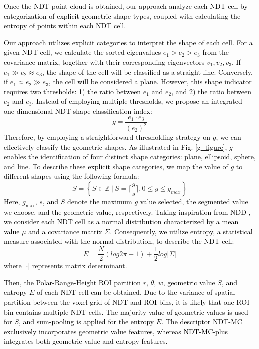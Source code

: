 \documentclass[letterpaper, 10 pt, conference]{ieeeconf}   %
\newcommand\kevin[1]{\textcolor{black}{#1}}
\begin{document}
\kevin{Once the NDT point cloud is obtained, our approach analyze each NDT cell by categorization of explicit geometric shape types, coupled with calculating the entropy of points within each NDT cell.}


\kevin{Our approach utilizes explicit categories to interpret the shape of each cell. For a given NDT cell, we calculate the sorted eigenvalues $e_1 > e_2 > e_3$ from the covariance matrix, together with their corresponding eigenvectors $v_1, v_2, v_3$. If $e_1 \gg e_2 \approx e_3$,  the shape of the cell will be classified as a straight line. Conversely, if $e_1 \approx e_2 \gg e_3$,  the cell will be considered a plane. However, this shape indicator requires two thresholds: 1) the ratio between $e_1$ and $e_2$, and 2) the ratio between $e_2$ and $e_3$. Instead of employing multiple thresholds, we propose an integrated one-dimensional NDT shape classification index:}
\begin{equation}
\label{g}
g=\frac{e_1\cdot e_3}{\left(e_2\right)^2}
\end{equation}
\kevin{Therefore, by employing a straightforward thresholding strategy on $g$, we can effectively classify the geometric shapes. As illustrated in Fig. \ref{g_figure}, $g$ enables the identification of four distinct shape categories: plane, ellipsoid, sphere, and line. To describe these explicit shape categories, we map the value of $g$ to different shapes using the following formula:}
\begin{equation}
    S = \left\{S \in \mathbb{Z}\ |\ S=\lceil \frac{g}{s} \rceil, 0\le g \le g_{max} \right\}
\end{equation}
\kevin{Here, $g_{\text{max}}$, $s$, and $S$ denote the maximum $g$ value selected, the segmented value we choose, and the geometric value, respectively.}
\kevin{Taking inspiration from NDD \cite{NDD}, we consider each NDT cell as a normal distribution characterized by a mean value $\mu$ and a covariance matrix $\Sigma$. Consequently, we utilize entropy, a statistical measure associated with the normal distribution, to describe the NDT cell:}
\begin{equation}
\label{entropy}
E=\frac{N}{2}(log2\pi+1)+\frac{1}{2} log\left| \Sigma \right|
\end{equation}
where $\left| \cdot \right|$ represents matrix determinant.

\kevin{Then, the Polar-Range-Height ROI partition $r$, $\theta$, $w$, geometric value $S$, and entropy $E$ of each NDT cell can be obtained. Due to the variance of spatial partition
between the voxel grid of NDT and ROI bins, it is likely that one ROI bin contains multiple NDT cells. The majority value of geometric values is used for $S$, and sum-pooling is applied for the entropy $E$.
The descriptor NDT-MC exclusively incorporates geometric value features, whereas NDT-MC-plus integrates both geometric value and entropy features.}
\end{document}
